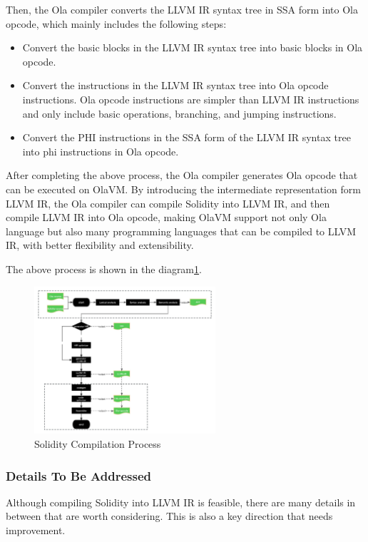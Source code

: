 Then, the Ola compiler converts the LLVM IR syntax tree in SSA form into Ola opcode, which mainly includes the following steps:
\begin{itemize}
    \item Convert the basic blocks in the LLVM IR syntax tree into basic blocks in Ola opcode.
    \item Convert the instructions in the LLVM IR syntax tree into Ola opcode instructions. Ola opcode instructions are simpler than LLVM IR instructions and only include basic operations, branching, and jumping instructions.
    \item Convert the PHI instructions in the SSA form of the LLVM IR syntax tree into phi instructions in Ola opcode.
\end{itemize}
After completing the above process, the Ola compiler generates Ola opcode that can be executed on OlaVM. By introducing the intermediate representation form LLVM IR, the Ola compiler can compile Solidity into LLVM IR, and then compile LLVM IR into Ola opcode, making OlaVM support not only Ola language but also many programming languages that can be compiled to LLVM IR, with better flexibility and extensibility.

The above process is shown in the diagram\ref{fig:solidity-compile}.

\begin{figure}[!ht]
    \centering
    \includegraphics[width=0.6\textwidth]{images/solidity-compile.jpg}
    \caption{Solidity Compilation Process}
    \label{fig:solidity-compile}
\end{figure}

\subsubsection{Details To Be Addressed}

Although compiling Solidity into LLVM IR is feasible, there are many details in between that are worth considering. This is also a key direction that needs improvement.


